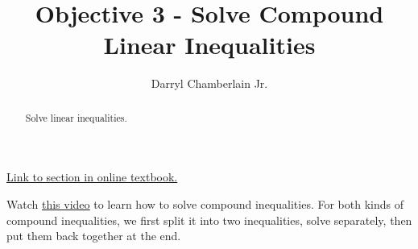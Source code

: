 \documentclass{ximera}
\author{Darryl Chamberlain Jr.}
\title{Objective 3 - Solve Compound Linear Inequalities}
\begin{document}
\begin{abstract}
Solve linear inequalities. 
\end{abstract}
\maketitle

\href{https://cnx.org/contents/mwjClAV_@8.1:uIjtHMfW@9/Linear-Inequalities-and-Absolute-Value-Inequalities}{Link to section in online textbook.}


Watch \underline{\href{https://mediasite.video.ufl.edu/Mediasite/Play/c9a9321595e84b0f8333324964f36b011d}{this video}}  to learn how to solve compound inequalities. For both kinds of compound inequalities, we first split it into two inequalities, solve separately, then put them back together at the end. 
\end{document}
